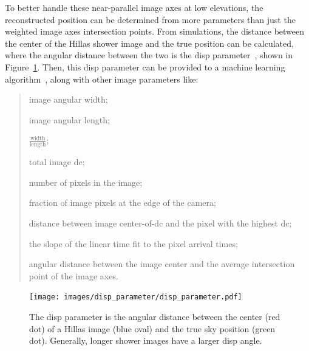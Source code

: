 To better handle these near-parallel image axes at low elevations, the reconstructed position can be determined from more parameters than just the weighted image axes intersection points.
From simulations, the distance between the center of the Hillas shower image and the true position can be calculated, where the angular distance between the two is the disp parameter~\cite{Senturk:2011}, shown in Figure~\ref{fig:dispdiagram}.
Then, this disp parameter can be provided to a machine learning algorithm~\cite{Beilicke2012NIM}, along with other image parameters like:
\begin{quote}
  \begin{description}[noitemsep]
    \item [width:] image angular width;
    \item [length:] image angular length;
    \item [wol:] $\frac{\textrm{width}}{\textrm{length}}$;
    \item [size:] total image dc;
    \item [ntubes:] number of pixels in the image;
    \item [loss:] fraction of image pixels at the edge of the camera;
    \item [asym:] distance between image center-of-dc and the pixel with the highest dc;
    \item [tgrad:] the slope of the linear time fit to the pixel arrival times;
    \item [cross:] angular distance between the image center and the average intersection point of the image axes.
  \end{description}
\end{quote}


\begin{figure}[t]
  \centering
  \texttt{[image: images/disp\_parameter/disp\_parameter.pdf]}
  \caption[Angular Reconstruction Disp]{
    The disp parameter is the angular distance between the center (red dot) of a Hillas image (blue oval) and the true sky position (green dot).
    Generally, longer shower images have a larger disp angle.
  }
  \label{fig:dispdiagram}
\end{figure}


